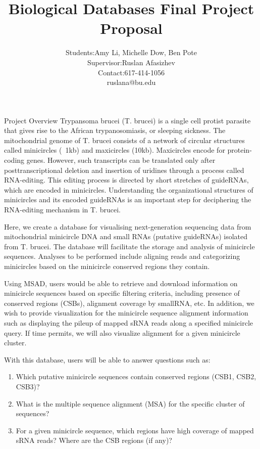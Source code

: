 \documentclass[a4paper,10pt,notitlepage]{article}
\title{Biological Databases Final Project Proposal}
\author{
    \begin{tabular}{l l}
    Students: & Amy Li, Michelle Dow, Ben Pote \\
    Supervisor: & Ruslan Afasizhev \\
    Contact: & 617-414-1056 \\
    & ruslana@bu.edu
\end{tabular}
}
\begin{document}
\lstset{language=sql}

\maketitle

\begin{section}{Project Overview}
Trypansoma brucei (T. brucei) is a single cell protist parasite that gives rise to the African trypanosomiasis, 
or sleeping sickness. The mitochondrial genome of T. brucei consists of a network of circular structures called 
minicircles (~1kb) and maxicircles (10kb). Maxicircles encode for protein-coding genes. However, such transcripts
can be translated only after posttranscriptional deletion and insertion of uridines through a process called 
RNA-editing. This editing process is directed by short stretches of guideRNAs, which are encoded in minicircles.
Understanding the organizational structures of minicircles and its encoded guideRNAs is an important step for 
deciphering the RNA-editing mechanism in T. brucei. 

Here, we create a database for visualising next-generation sequencing data from mitochondrial minicircle DNA and
small RNAs (putative guideRNAs) isolated from T. brucei. The database will facilitate the storage and analysis of 
minicircle sequences. Analyses to be performed include aligning reads and categorizing minicircles based on the 
minicircle conserved regions they contain. 

Using MSAD, users would be able to retrieve and download information on minicircle sequences based on specific 
filtering criteria, including presence of conserved regions (CSBs), alignment coverage by smallRNA, etc. In 
addition, we wish to provide visualization for the minicircle sequence alignment information such as displaying 
the pileup of mapped sRNA reads along a specified minicircle query. If time permits, we will also visualize 
alignment for a given minicircle cluster.
 
With this database, users will be able to answer questions such as:

\begin{enumerate}
    \item Which putative minicircle sequences contain conserved regions (CSB1, CSB2, CSB3)?
    \item What is the multiple sequence alignment (MSA) for the specific cluster of sequences?
    \item For a given minicircle sequence, which regions have high coverage of mapped sRNA reads? Where are the CSB regions (if any)?
\end{enumerate}



\end{section}
\end{document}
